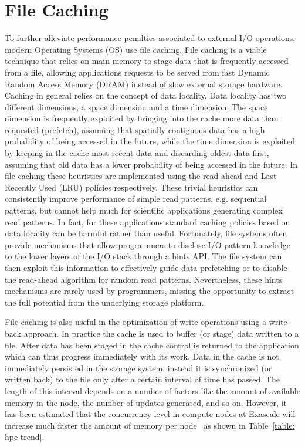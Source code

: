 \section{File Caching}
To further alleviate performance penalties associated to external I/O operations, modern Operating Systems (OS) use file caching. File caching is a viable technique that relies on main memory to stage data
that is frequently accessed from a file, allowing applications requests to be served from fast Dynamic Random Access Memory (DRAM) instead of slow external storage hardware. Caching in general relies on the concept of data 
locality. Data locality has two different dimensions, a space dimension and a time dimension. The space dimension is frequently exploited by bringing into the cache more data than requested (prefetch), assuming that 
spatially contiguous data has a high probability of being accessed in the future, while the time dimension is exploited by keeping in the cache most recent data and discarding oldest data first, assuming that old data 
has a lower probability of being accessed in the future. In file caching these heuristics are implemented using the read-ahead and Last Recently Used (LRU) policies respectively.
These trivial heuristics can consistently improve performance of simple read patterns, e.g. sequential patterns, but cannot help much for scientific applications generating complex read patterns. In fact,
for these applications standard caching policies based on data locality can be harmful rather than useful. Fortunately, file systems often provide mechanisms that allow programmers to disclose I/O pattern 
knowledge to the lower layers of the I/O stack through a hints API. The file system can then exploit this information to effectively guide data prefetching or to disable the read-ahead algorithm for random 
read patterns. Nevertheless, these hints mechanisms are rarely used by programmers, missing the opportunity to extract the full potential from the underlying storage platform.

File caching is also useful in the optimization of write operations using a write-back approach. In practice the cache is used to buffer (or stage) data written to a file. After data has been staged in the cache
control is returned to the application which can thus progress immediately with its work. Data in the cache is not immediately persisted in the storage system, instead it is synchronized (or written back) to 
the file only after a certain interval of time has passed. The length of this interval depends on a number of factors like the amount of available memory in the node, the number of updates generated, and so on.
However, it has been estimated that the concurrency level in compute nodes at Exascale will increase much faster the amount of memory per node~\cite{ASCAC2010} as shown in Table~\ref{table: hpc-trend}.


